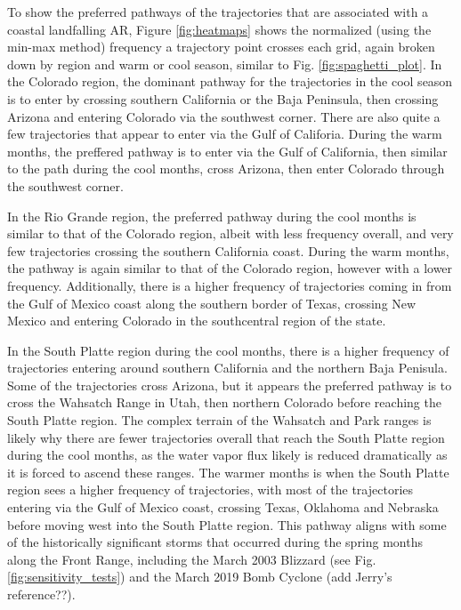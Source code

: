 \documentclass[draft]{agujournal2019}
\begin{document}
To show the preferred pathways of the trajectories that are associated with a coastal landfalling AR, Figure \ref{fig:heatmaps} shows the normalized (using the min-max method) frequency a trajectory point crosses each grid, again broken down by region and warm or cool season, similar to Fig. \ref{fig:spaghetti_plot}. In the Colorado region, the dominant pathway for the trajectories in the cool season is to enter by crossing southern California or the Baja Peninsula, then crossing Arizona and entering Colorado via the southwest corner. There are also quite a few trajectories that appear to enter via the Gulf of Califoria. During the warm months, the preffered pathway is to enter via the Gulf of California, then similar to the path during the cool months, cross Arizona, then enter Colorado through the southwest corner. 

In the Rio Grande region, the preferred pathway during the cool months is similar to that of the Colorado region, albeit with less frequency overall, and very few trajectories crossing the southern California coast. During the warm months, the pathway is again similar to that of the Colorado region, however with a lower frequency. Additionally, there is a higher frequency of trajectories coming in from the Gulf of Mexico coast along the southern border of Texas, crossing New Mexico and entering Colorado in the southcentral region of the state. 

In the South Platte region during the cool months, there is a higher frequency of trajectories entering around southern California and the northern Baja Penisula. Some of the trajectories cross Arizona, but it appears the preferred pathway is to cross the Wahsatch Range in Utah, then northern Colorado before reaching the South Platte region. The complex terrain of the Wahsatch and Park ranges is likely why there are fewer trajectories overall that reach the South Platte region during the cool months, as the water vapor flux likely is reduced dramatically as it is forced to ascend these ranges. The warmer months is when the South Platte region sees a higher frequency of trajectories, with most of the trajectories entering via the Gulf of Mexico coast, crossing Texas, Oklahoma and Nebraska before moving west into the South Platte region. This pathway aligns with some of the historically significant storms that occurred during the spring months along the Front Range, including the March 2003 Blizzard (see Fig. \ref{fig:sensitivity_tests}) and the March 2019 Bomb Cyclone (add Jerry's reference??). 
\end{document}
